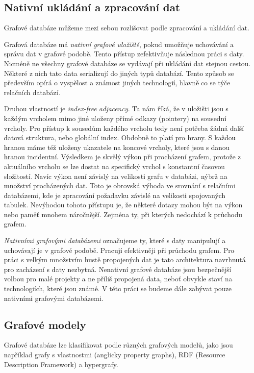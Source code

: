 \documentclass[
  program=infoi,
  biblatex=true,
  sourcecodes=true,
  figures=true,
  glossaries=false,
  index
]{kidiplom}
\begin{document}
\subsection{Nativní ukládání a zpracování dat}
\cite{indexFreeAdjacency}
Grafové databáze můžeme mezi sebou rozlišovat podle zpracování a ukládání dat.

Grafová databáze má \textit{nativní grafové uložiště}, pokud umožňuje uchovávání a správu dat v grafové podobě. Tento přístup zefektivňuje následnou práci s daty. Nicméně ne všechny grafové databáze se vydávají při ukládání dat stejnou cestou. Některé z nich tato data serializují do jiných typů databází. Tento způsob se především opírá o vyspělost a známost jiných technologií, hlavně co se týče relačních databází.

Druhou vlastností je \textit{index-free adjacency}. Ta nám říká, že v uložišti jsou s každým vrcholem mimo jiné uloženy přímé odkazy (pointery) na sousední vrcholy. Pro přístup k sousedům každého vrcholu tedy není potřeba žádná další datová struktura, nebo globální index. Obdobně to platí pro hrany. S každou hranou máme též uloženy ukazatele na koncové vrcholy, které jsou s danou hranou incidentní. Výsledkem je skvělý výkon při procházení grafem, protože z aktuálního vrcholu se lze dostat na specifický vrchol s konstantní časovou složitostí. Navíc výkon není závislý na velikosti grafu v databázi, nýbrž na množství procházených dat. Toto je obrovská výhoda ve srovnání s relačními databázemi, kde je zpracování požadavku závislé na velikosti spojovaných tabulek. Nevýhodou tohoto přístupu je, že některé dotazy mohou být na výkon nebo paměť mnohem náročnější. Zejména ty, při kterých nedochází k průchodu grafem.

\textit{Nativními grafovými databázemi} označujeme ty, které s daty manipulují a uchovávají je v grafové podobě. Pracují efektivněji při průchodu grafem. Pro práci s velkým množstvím hustě propojených dat je tato architektura navrhnutá pro zacházení s daty nezbytná. Nenativní grafové databáze jsou bezpečnější volbou pro malé projekty a ne příliš propojená data, neboť obvykle staví na technologiích, které jsou známé. V této práci se budeme dále zabývat pouze nativními grafovými databázemi.

\subsection{Grafové modely}
Grafové databáze lze klasifikovat podle různých grafových modelů, jako jsou například grafy s vlastnostmi (anglicky property graphs), RDF (Resource Description Framework) a hypergrafy.
\end{document}
